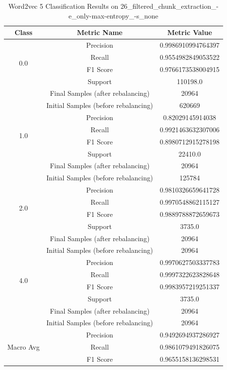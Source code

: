 \begin{longtable}{|c|c|c|}
\caption{Word2vec 5 Classification Results on 26\_filtered\_chunk\_extraction\_-e\_only-max-entropy\_-s\_none} \label{tab:26_filtered_chunk_extraction_-e_only-max-entropy_-s_none_word2vec_5_classifiers_results} \\
\hline
Class & Metric Name & Metric Value \\
\hline
\multirow{4}{*}{0.0} & Precision & 0.9986910994764397 \\
 & Recall & 0.9554982849053522 \\
 & F1 Score & 0.9766173538004915 \\
 & Support & 110198.0 \\
 & Final Samples (after rebalancing) & 20964 \\
 & Initial Samples (before rebalancing) & 620669 \\
\hline
\multirow{4}{*}{1.0} & Precision & 0.82029145914038 \\
 & Recall & 0.9921463632307006 \\
 & F1 Score & 0.8980712915278198 \\
 & Support & 22410.0 \\
 & Final Samples (after rebalancing) & 20964 \\
 & Initial Samples (before rebalancing) & 125784 \\
\hline
\multirow{4}{*}{2.0} & Precision & 0.9810326659641728 \\
 & Recall & 0.9970548862115127 \\
 & F1 Score & 0.9889788872659673 \\
 & Support & 3735.0 \\
 & Final Samples (after rebalancing) & 20964 \\
 & Initial Samples (before rebalancing) & 20964 \\
\hline
\multirow{4}{*}{4.0} & Precision & 0.9970627503337783 \\
 & Recall & 0.9997322623828648 \\
 & F1 Score & 0.9983957219251337 \\
 & Support & 3735.0 \\
 & Final Samples (after rebalancing) & 20964 \\
 & Initial Samples (before rebalancing) & 20964 \\
\hline
\multirow{4}{*}{Macro Avg} & Precision & 0.9492694937286927 \\
 & Recall & 0.9861079491826075 \\
 & F1 Score & 0.9655158136298531 \\

\end{longtable}
